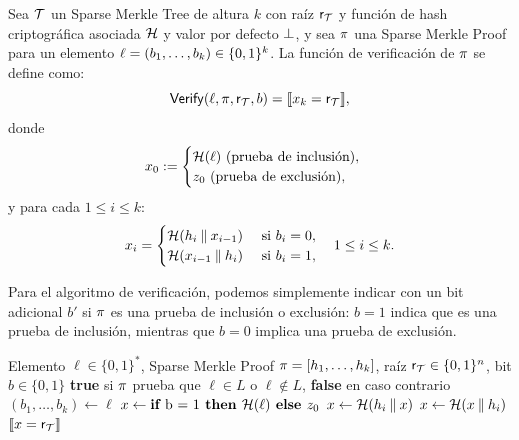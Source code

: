 \begin{definition}
\label{def:apendice-a-sparse-merkle-tree-funcion-de-verificacion-de-una-sparse-merkle-proof}
	Sea $\mathcal{T}$ un Sparse Merkle Tree de altura $k$ con raíz $\mathsf{r}_{\mathcal{T}}$ y función de hash criptográfica asociada $\mathcal{H}$ y valor por defecto $\bot$, y sea $\pi$ una Sparse Merkle Proof para un elemento $\ell = (b_1, \ldots, b_k) \in \{0,1\}^{k}$. La función de verificación de $\pi$ se define como:
		$$\mathsf{Verify}(\ell, \pi, \mathsf{r}_{\mathcal{T}}, b) = \llbracket x_k = \mathsf{r}_{\mathcal{T}} \rrbracket,$$
	donde
	$$x_0 := \begin{cases}
		\mathcal{H}(\ell) \text{ (prueba de inclusión)}, \\
			z_{0} \text{ (prueba de exclusión)},
	\end{cases}$$
	y para cada $1 \leq i \leq k$:
	$$x_i = \begin{cases}
		\mathcal{H}(h_i \mathbin{\|} x_{i-1}) & \text{ si } b_i = 0, \\
		\mathcal{H}(x_{i-1} \mathbin{\|} h_i) & \text{ si } b_i = 1,
	\end{cases} \quad 1 \leq i \leq k.$$
\end{definition}

Para el algoritmo de verificación, podemos simplemente indicar con un bit adicional $b'$ si $\pi$ es una prueba de inclusión o exclusión: $b = 1$ indica que es una prueba de inclusión, mientras que $b = 0$ implica una prueba de exclusión.

\begin{algorithm}[ht]
	\caption{Verificación de una Sparse Merkle Proof}
	\label{alg:verify-sparse-merkle-proof}
	\begin{algorithmic}[1]
		\Require Elemento $\ell \in \{0,1\}^*$, Sparse Merkle Proof $\pi = [h_1, \ldots, h_k]$, raíz $\mathsf{r}_{\mathcal{T}} \in \{0,1\}^n$, bit $b \in \{0,1\}$
		\Ensure \textbf{true} si $\pi$ prueba que $\ell \in L$ o $\ell \notin L$, \textbf{false} en caso contrario
		\State $(b_1, \ldots, b_k) \gets \ell$ 
		\State $x \gets \textbf{if } \text{b = 1} \textbf{ then } \mathcal{H}(\ell) \textbf{ else } z_{0}$
			 
				\State $x \gets \mathcal{H}(h_i \mathbin{\|} x)$
			\Else {}
				\State $x \gets \mathcal{H}(x \mathbin{\|} h_i)$
			\EndIf
		\EndFor
		\State \Return $\llbracket x = \mathsf{r}_{\mathcal{T}} \rrbracket$
	\end{algorithmic}
\end{algorithm}

